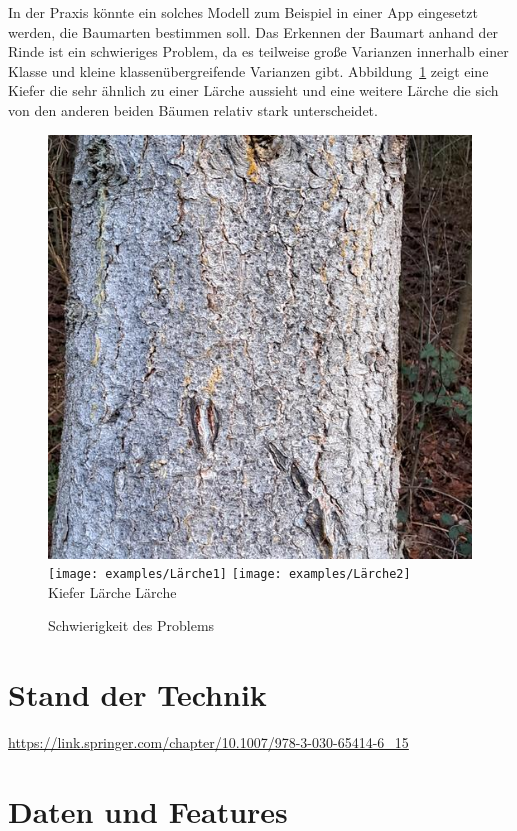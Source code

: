 \documentclass{article}
\begin{document}
In der Praxis könnte ein solches Modell zum Beispiel in einer App eingesetzt werden, die Baumarten bestimmen soll. Das Erkennen der Baumart anhand der Rinde ist ein schwieriges Problem, da es teilweise gro\ss e Varianzen innerhalb einer Klasse und kleine klassenübergreifende Varianzen gibt. Abbildung~\ref{problem} zeigt eine Kiefer die sehr ähnlich zu einer Lärche aussieht und eine weitere Lärche die sich von den anderen beiden Bäumen relativ stark unterscheidet.

\begin{figure}[htbp!]
  \centering
  \includegraphics[width=0.32\linewidth]{examples/Kiefer}
  \texttt{[image: examples/Lärche1]}
  \texttt{[image: examples/Lärche2]}\\
  Kiefer \hspace{100px} Lärche \hspace{100px} Lärche
  \caption{Schwierigkeit des Problems}
  \label{problem}
\end{figure}

\section{Stand der Technik}
\url{https://link.springer.com/chapter/10.1007/978-3-030-65414-6_15}

\section{Daten und Features}
\end{document}
